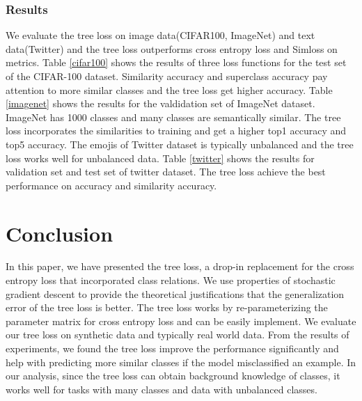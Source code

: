 \documentclass[twoside]{article}
\theoremstyle{definition}
\begin{document}
\subsubsection{Results}
We evaluate the tree loss on image data(CIFAR100, ImageNet) and text data(Twitter) and the tree loss outperforms cross entropy loss and Simloss on metrics.
Table \ref{cifar100} shows the results of three loss functions for the test set of the CIFAR-100 dataset.
Similarity accuracy and superclass accuracy pay attention to more similar classes and the tree loss get higher accuracy.
Table \ref{imagenet} shows the results for the valdidation set of ImageNet dataset.
ImageNet has 1000 classes and many classes are semantically  similar.
The tree loss incorporates the similarities to training and get a higher top1 accuracy and top5 accuracy.
The emojis of Twitter dataset is typically unbalanced and the tree loss works well for unbalanced data.
Table \ref{twitter} shows the results for validation set and test set of twitter dataset.
The tree loss achieve the best performance on accuracy and similarity accuracy.


\section{Conclusion}
In this paper, we have presented the tree loss, a drop-in replacement for the cross entropy loss that incorporated class relations. 
We use properties of stochastic gradient descent to provide the theoretical justifications that the generalization error of the tree loss is better. 
The tree loss works by re-parameterizing the parameter matrix for cross entropy loss and can be easily implement. 
We evaluate our tree loss on synthetic data and typically real world data. 
From the results of experiments, we found the tree loss improve the performance significantly and  help with predicting more similar classes if the model misclassified an example. 
In our analysis, since the tree loss can obtain background knowledge of classes, it works well for tasks with many classes and data with unbalanced classes. 




\end{document}

